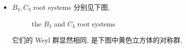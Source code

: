 \begin{itemize}
	\item $B_3, C_3$ root systems 分别见下图,
	
	\begin{figure}[H]
		\centering
		\caption{the $B_3$ and $C_3$ root systems}
	\end{figure}
	
	它们的 Weyl 群显然相同, 是下图中黄色立方体的对称群,
	

\end{itemize}
